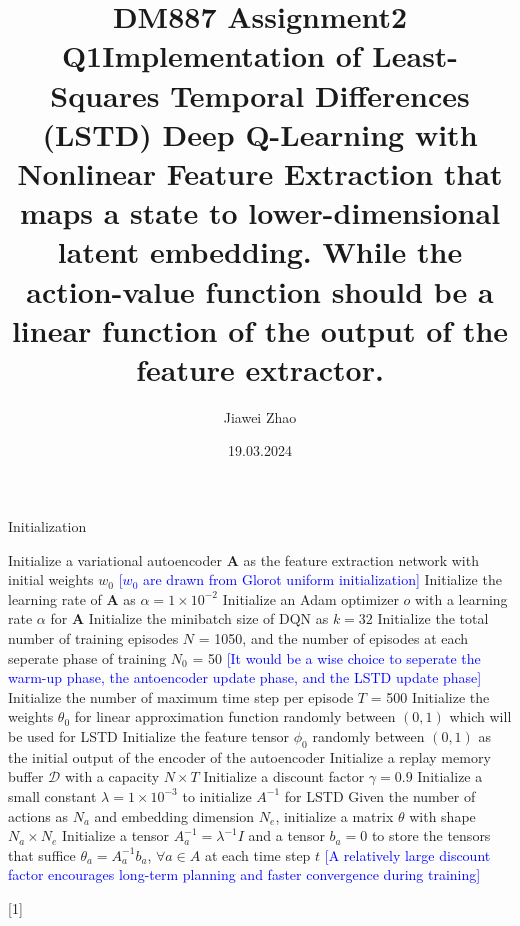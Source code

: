 \documentclass[a4paper,12pt,oneside]{article}
\numberwithin{equation}{section}
\begin{document}
\title{DM887 Assignment2 Q1}
\author{Jiawei Zhao}
\date{19.03.2024}
\maketitle
\title {Implementation of Least-Squares Temporal Differences (LSTD) Deep Q-Learning with Nonlinear Feature Extraction that maps a state to lower-dimensional latent embedding. While the action-value function should be a linear function of the output of the feature extractor.}

\newcommand{\mycomment}[1]{{\fontfamily{lmss}\selectfont\textcolor{blue}{[#1]}}} %
    \begin{algorithm}
        \begin{algorithmic}[1]
        \caption{Initialization}
        \State Initialize a variational autoencoder $\mathbf{A}$ as the feature extraction network with initial weights \(w_0\)
        \mycomment {\(w_0\) are drawn from Glorot uniform initialization}
        \State Initialize the learning rate of $\mathbf{A}$ as $\alpha=1 \times 10^{-2}$ 
        \State Initialize an Adam optimizer \(o\) with a learning rate $\alpha$ for $\mathbf{A}$
        \State Initialize the minibatch size of DQN as \(k=32\) 
        \State Initialize the total number of training episodes \(N\) = 1050, and the number of episodes at each seperate phase of training \(N_0\) = 50
        \mycomment {It would be a wise choice to seperate the warm-up phase, the antoencoder update phase, and the LSTD update phase}
        \State Initialize the number of maximum time step per episode \(T\) = 500
        \State Initialize the weights $\theta_0$ for linear approximation function randomly between $(0, 1)$ which will be used for LSTD
        \State Initialize the feature tensor $\phi_0$ randomly between $(0, 1)$ as the initial output of the encoder of the autoencoder
        \State Initialize a replay memory buffer $\mathcal{D}$ with a capacity \(N \times T\)
        \State Initialize a discount factor $\gamma=0.9$ 
        \State Initialize a small constant $\lambda=1 \times 10^{-3}$ to initialize $A^{-1}$ for LSTD
        \State Given the number of actions as \(N_a\) and embedding dimension \(N_e\), initialize a matrix $\theta$ with shape $N_a \times N_e$
        \State Initialize a tensor $A_a^{-1} = \lambda^{-1}I$ and a tensor $b_a=0$ to store the tensors that suffice $\theta_{a} = A_a^{-1} b_a$, $\forall a \in A$ at each time step $t$
        \mycomment{A relatively large discount factor encourages long-term planning and faster convergence during training}
        \end{algorithmic}[1]
    \end{algorithm}
        
\end{document}
